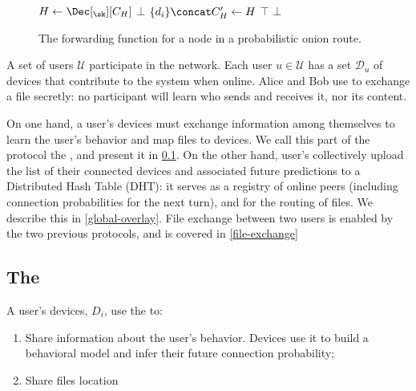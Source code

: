\begin{figure}
  \begin{algorithmic}
      \State $H\gets \Dec[_\sk][C_H]$
        \State \Return $\bot$
      \EndIf
      \State $\{d_i\}\concat C_H'\gets H$
          \State \Return $\top$
        \EndIf
      \EndFor
      \State \Return $\bot$
    \EndFunction
  \end{algorithmic}
  \caption{\label{SPORFwd}%
    The forwarding function for a node in a probabilistic onion route.%
  }
\end{figure}

A set of users $\mathcal{U}$ participate in the \name network.
Each user $u \in \mathcal{U}$ has a set $\mathcal{D}_u$ of devices that contribute to the system when online.
Alice and Bob use \name to exchange a file secretly: no participant will learn who sends and receives it, nor its content.

On one hand, a user's devices must exchange information among themselves to learn the user's behavior  and map files to devices.
We call this part of the protocol the \localoverlay, and present it in 
\cref{local-overlay}. On the other hand, user's collectively upload the list of 
their connected devices and associated future predictions to a Distributed Hash 
Table (DHT): it serves as a registry of online peers (including connection 
probabilities for the next turn), and for the routing of files.
We describe this \globaloverlay in \cref{global-overlay}. File exchange between 
two users is enabled by the two previous protocols, and is covered in 
\cref{file-exchange}

\subsection{The \localoverlay}%
\label{local-overlay}

A user's devices, \(D_i\), use the \localoverlay to:
\begin{enumerate}
	\item Share information about the user's behavior.
	Devices use it to build a behavioral model and infer their future connection probability;
  \item Share files location 
\end{enumerate}

